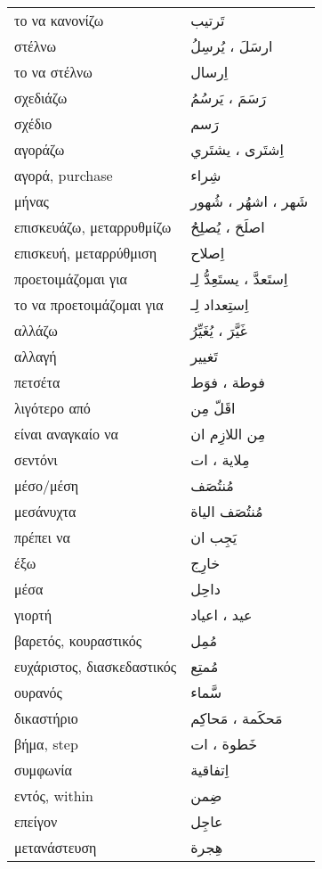 \documentclass[twocolumn,a4paper]{article}
\newcommand{\ar}[1]{\textarabic{#1}}
\newcommand{\pl}{\raisebox{0.15ex}{\footnotesize ◍}}
\newcommand{\normpl}[1]{\ar{ #1، ات }}
\newcommand{\vrf}{\raisebox{0.15ex}{\footnotesize ◉}}
\newcommand{\mas}{\raisebox{0.15ex}{\footnotesize ◫}}
\begin{document}
\begin{mpsupertabular}{ P{0.5\textwidth} P{0.5\textwidth} }
το να κανονίζω \mas          & \ar{ تَرتيب } \\
στέλνω \vrf                  & \ar{ ارسَلَ ، يُرسِلُ } \\ %
το να στέλνω \mas            & \ar{ اِرسال } \\
σχεδιάζω \vrf                & \ar{ رَسَمَ ، يَرسُمُ } \\  %
σχέδιο \mas                  & \ar{ رَسم } \\
αγοράζω \vrf                 & \ar{ اِشتَرى ، يشتَري } \\ %
αγορά, purchase \mas         & \ar{ شِراء } \\
μήνας \pl                    & \ar{ شَهر ، اشهُر ، شُهور } \\
επισκευάζω, μεταρρυθμίζω \vrf & \ar{ اصلَحَ ، يُصلِحُ } \\ %
επισκευή, μεταρρύθμιση \mas  & \ar{ اِصلاح } \\
προετοιμάζομαι για \vrf      & \ar{ اِستَعدَّ ، يستَعِدُّ لِـ } \\ %
το να προετοιμάζομαι για \mas & \ar{ اِستِعداد لِـ } \\
αλλάζω \vrf                  & \ar{ غَيَّرَ ، يُغَيِّرُ } \\ %
αλλαγή \mas                  & \ar{ تَغيير } \\
πετσέτα \pl                  & \ar{ فوطة ، فوَط } \\
λιγότερο από                 & \ar{ اقَلّ مِن } \\
είναι αναγκαίο να            & \ar{ مِن اللازِم ان } \\
σεντόνι \pl                  & \normpl{ مِلاية } \\
μέσο/μέση                    & \ar{ مُنتُصَف } \\
μεσάνυχτα                    & \ar{ مُنتُصَف الياة } \\
πρέπει να                    & \ar{ يَجِب ان } \\
έξω                          & \ar{ خارِج } \\
μέσα                         & \ar{ داحِل } \\
γιορτή \pl                   & \ar{ عيد ، اعياد } \\
βαρετός, κουραστικός         & \ar{ مُمِل } \\
ευχάριστος, διασκεδαστικός   & \ar{ مُمتِع } \\
ουρανός                      & \ar{ سَّماء } \\
δικαστήριο \pl               & \ar{ مَحكَمة ، مَحاكِم } \\
βήμα, step \pl               & \normpl{ خَطوة } \\
συμφωνία                     & \ar{ اِتفاقية } \\
εντός, within                & \ar{ ضِمن } \\
επείγον                      & \ar{ عاجِل } \\
μετανάστευση                 & \ar{ هِجرة } \\


\end{mpsupertabular}
\end{document}
